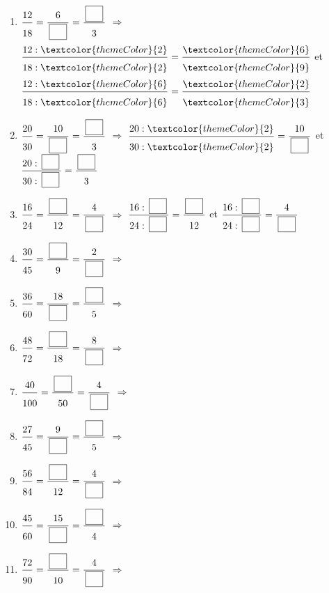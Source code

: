 \begin{enumerate}[leftmargin=*,align=parleft, label=\alph*), itemsep=9pt]
\item $\FA{12}{18}=\FA{6}{\CaseC}=\FA{\CaseC}{3}$ \quad $\Longrightarrow$ \quad $\FA{12 : \textcolor{themeColor}{2}}{18 : \textcolor{themeColor}{2}}=\FA{\textcolor{themeColor}{6}}{\textcolor{themeColor}{9}}$ \quad et \quad $\FA{12 : \textcolor{themeColor}{6}}{18 : \textcolor{themeColor}{6}}=\FA{\textcolor{themeColor}{2}}{\textcolor{themeColor}{3}}$
\item $\FA{20}{30}=\FA{10}{\CaseC}=\FA{\CaseC}{3}$ \quad $\Longrightarrow$ \quad $\FA{20 : \textcolor{themeColor}{2}}{30 : \textcolor{themeColor}{2}}=\FA{10}{\CaseC}$ \quad et \quad $\FA{20 : \CaseC}{30 : \CaseC}=\FA{\CaseC}{3}$
\item $\FA{16}{24}=\FA{\CaseC}{12}=\FA{4}{\CaseC}$ \quad $\Longrightarrow$ \quad $\FA{16 : \CaseC}{24 : \CaseC}=\FA{\CaseC}{12}$ \quad et \quad $\FA{16 : \CaseC}{24 : \CaseC}=\FA{4}{\CaseC}$
\item $\FA{30}{45}=\FA{\CaseC}{9}=\FA{2}{\CaseC}$ \quad $\Longrightarrow$
\item $\FA{36}{60}=\FA{18}{\CaseC}=\FA{\CaseC}{5}$ \quad $\Longrightarrow$
\item $\FA{48}{72}=\FA{\CaseC}{18}=\FA{8}{\CaseC}$ \quad $\Longrightarrow$
\item $\FA{40}{100}=\FA{\CaseC}{50}=\FA{4}{\CaseC}$ \quad $\Longrightarrow$
\item $\FA{27}{45}=\FA{9}{\CaseC}=\FA{\CaseC}{5}$ \quad $\Longrightarrow$
\item $\FA{56}{84}=\FA{\CaseC}{12}=\FA{4}{\CaseC}$ \quad $\Longrightarrow$
\item $\FA{45}{60}=\FA{15}{\CaseC}=\FA{\CaseC}{4}$ \quad $\Longrightarrow$
\item $\FA{72}{90}=\FA{\CaseC}{10}=\FA{4}{\CaseC}$ \quad $\Longrightarrow$
\end{enumerate}
 
\newpage
{}
 
